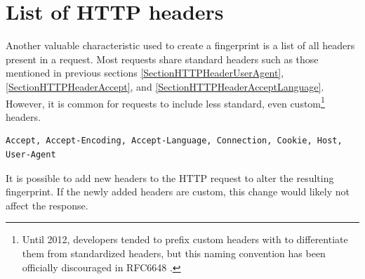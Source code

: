 \section{List of HTTP headers}

Another valuable characteristic used to create a fingerprint is a list of all headers present in a request. Most requests share standard headers such as those mentioned in previous sections \ref{SectionHTTPHeaderUserAgent}, \ref{SectionHTTPHeaderAccept}, and \ref{SectionHTTPHeaderAcceptLanguage}. However, it is common for requests to include less standard, even custom\footnote{Until 2012, developers tended to prefix custom headers with  to differentiate them from standardized headers, but this naming convention has been officially discouraged in RFC6648 \cite{RFC6648}.} headers.

\bigbreak

\begin{lstlisting}[caption={An example of a list of headers present in an HTTP request.}]
Accept, Accept-Encoding, Accept-Language, Connection, Cookie, Host, User-Agent
\end{lstlisting}

\medbreak

It is possible to add new headers to the HTTP request to alter the resulting fingerprint. If the newly added headers are custom, this change would likely not affect the response.

% 